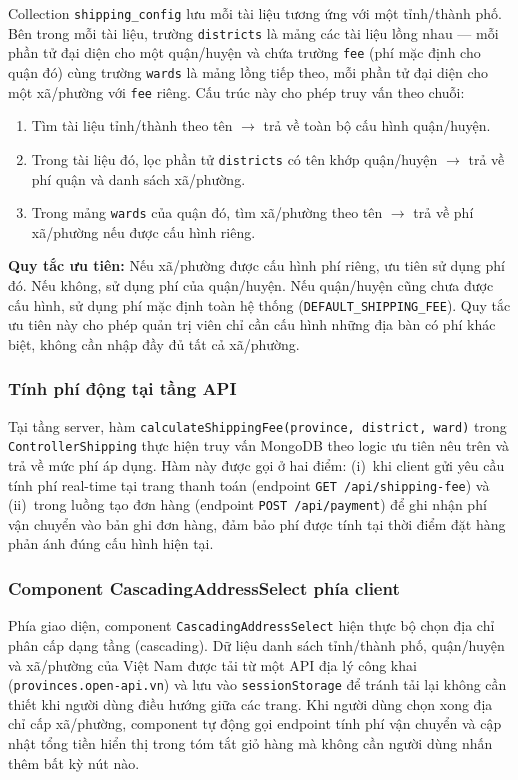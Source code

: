 \documentclass[../DoAn.tex]{subfiles}
\begin{document}
Collection \texttt{shipping\_config} lưu mỗi tài liệu tương ứng với một
tỉnh/thành phố. Bên trong mỗi tài liệu, trường \texttt{districts} là mảng
các tài liệu lồng nhau --- mỗi phần tử đại diện cho một quận/huyện và chứa
trường \texttt{fee} (phí mặc định cho quận đó) cùng trường \texttt{wards}
là mảng lồng tiếp theo, mỗi phần tử đại diện cho một xã/phường với
\texttt{fee} riêng. Cấu trúc này cho phép truy vấn theo chuỗi:
\begin{enumerate}
  \item Tìm tài liệu tỉnh/thành theo tên $\to$ trả về toàn bộ cấu hình quận/huyện.
  \item Trong tài liệu đó, lọc phần tử \texttt{districts} có tên khớp quận/huyện
        $\to$ trả về phí quận và danh sách xã/phường.
  \item Trong mảng \texttt{wards} của quận đó, tìm xã/phường theo tên $\to$
        trả về phí xã/phường nếu được cấu hình riêng.
\end{enumerate}

\textbf{Quy tắc ưu tiên:} Nếu xã/phường được cấu hình phí riêng, ưu tiên sử
dụng phí đó. Nếu không, sử dụng phí của quận/huyện. Nếu quận/huyện cũng chưa
được cấu hình, sử dụng phí mặc định toàn hệ thống (\texttt{DEFAULT\_SHIPPING\_FEE}).
Quy tắc ưu tiên này cho phép quản trị viên chỉ cần cấu hình những địa bàn có
phí khác biệt, không cần nhập đầy đủ tất cả xã/phường.

\subsubsection*{Tính phí động tại tầng API}

Tại tầng server, hàm \texttt{calculateShippingFee(province, \break district, ward)}
trong \texttt{ControllerShipping} thực hiện truy vấn MongoDB theo logic ưu
tiên nêu trên và trả về mức phí áp dụng. Hàm này được gọi ở hai điểm:
(i)~khi client gửi yêu cầu tính phí real-time tại trang thanh toán (endpoint
\texttt{GET /api/shipping-fee}) và (ii)~trong luồng tạo đơn hàng (endpoint
\texttt{POST /api/payment}) để ghi nhận phí vận chuyển vào bản ghi đơn hàng,
đảm bảo phí được tính tại thời điểm đặt hàng phản ánh đúng cấu hình hiện tại.

\subsubsection*{Component CascadingAddressSelect phía client}

Phía giao diện, component \texttt{CascadingAddressSelect} hiện thực bộ chọn
địa chỉ phân cấp dạng tầng (cascading). Dữ liệu danh sách tỉnh/thành phố,
quận/huyện và xã/phường của Việt Nam được tải từ một API địa lý công khai
(\texttt{provinces.open-api.vn}) và lưu vào \texttt{sessionStorage} để tránh
tải lại không cần thiết khi người dùng điều hướng giữa các trang. Khi người
dùng chọn xong địa chỉ cấp xã/phường, component tự động gọi endpoint tính
phí vận chuyển và cập nhật tổng tiền hiển thị trong tóm tắt giỏ hàng mà không
cần người dùng nhấn thêm bất kỳ nút nào.
\end{document}

